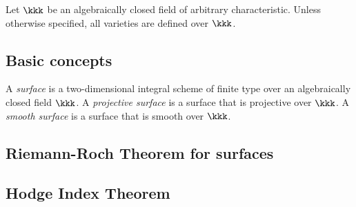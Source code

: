 Let \(\kkk\) be an algebraically closed field of arbitrary characteristic.
Unless otherwise specified, all varieties are defined over \(\kkk\).

\subsection{Basic concepts}

    \begin{definition}\label{def:surface}
        A \emph{surface} is a two-dimensional integral scheme of finite type over an algebraically closed field \(\kkk\).
        A \emph{projective surface} is a surface that is projective over \(\kkk\).
        A \emph{smooth surface} is a surface that is smooth over \(\kkk\).
    \end{definition}


\subsection{Riemann-Roch Theorem for surfaces}


\subsection{Hodge Index Theorem}
